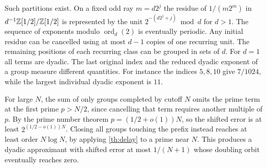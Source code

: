 \documentclass[11pt]{article}
\DeclareMathOperator{\ord}{ord}
\begin{document}
Such partitions exist. On a fixed odd ray $m=d2^j$ the residue of $1/(m2^m)$ in $d^{-1}\mathbb Z[1/2]/\mathbb Z[1/2]$ is represented by the unit $2^{-(d2^j+j)}\bmod d$ for $d>1$. The sequence of exponents modulo $\ord_d(2)$ is eventually periodic. Any initial residue can be cancelled using at most $d-1$ copies of one recurring unit. The remaining positions of each recurring class can be grouped in sets of $d$. For $d=1$ all terms are dyadic. The last original index and the reduced dyadic exponent of a group measure different quantities. For instance the indices $5,8,10$ give $7/1024$, while the largest individual dyadic exponent is $11$.

For large $N$, the sum of only groups completed by cutoff $N$ omits the prime term at the first prime $p>N/2$, since cancelling that term requires another multiple of $p$. By the prime number theorem $p=(1/2+o(1))N$, so the shifted error is at least $2^{(1/2-o(1))N}$. Closing all groups touching the prefix instead reaches at least order $N\log N$, by applying \cref{th:delay} to a prime near $N$. This produces a dyadic approximant with shifted error at most $1/(N+1)$ whose doubling orbit eventually reaches zero.
\end{document}
